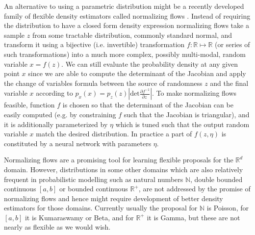 \documentclass[12pt]{article}
\begin{document}
An alternative to using a parametric distribution might be a recently developed family of flexible density estimators called normalizing flows \citep{RezendeMohamed2015,IAF,MAF}.
Instead of requiring the distribution to have a closed form density expression normalizing flows take a sample $z$ from some tractable distribution, commonly standard normal, and transform it using a bijective (i.e. invertible) transformation $f: \mathbb{R} \mapsto \mathbb{R}$ (or series of such transformations) into a much more complex, possibly multi-modal, random variable $x=f(z)$.
We can still evaluate the probability density at any given point $x$ since we are able to compute the determinant of the Jacobian and apply the change of variables formula between the source of randomness $z$ and the final variable $x$ according to 
$p_x(x) = p_z(z) \left|
    \mathrm{det} \frac{
      \partial f^{-1}
    }{
      \partial z\
    }
  \right|$.
To make normalizing flows feasible, function $f$ is chosen so that the determinant of the Jacobian can be easily computed (e.g. by constraining $f$ such that the Jacobian is triangular), and it is additionally parameterized by $\eta$ which is tuned such that the output random variable $x$ match the desired distribution. In practice a part of $f(z, \eta)$ is constituted by a neural network with parameters $\eta$.



Normalizing flows are a promising tool for learning flexible proposals for the $\mathbb{R}^d$ domain.
However, distributions in some other domains which are also relatively frequent in probabilistic modelling such as natural numbers $\mathbb{N}$, double bounded continuous $[a,b]$ or bounded continuous $\mathbb{R}^+$, are not addressed by the promise of normalizing flows and hence might require development of better density estimators for those domains.
Currently usually the proposal for $\mathbb{N}$ is Poisson, for $[a,b]$ it is Kumaraswamy or Beta, and for $\mathbb{R}^+$ it is Gamma, 
but these are not nearly as flexible as we would wish.
\end{document}
